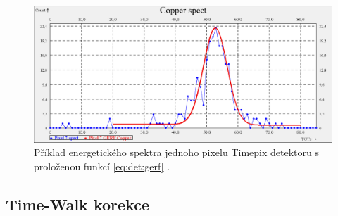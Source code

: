 \begin{figure}[th]
	\begin{center}
		\includegraphics[width=12cm]{figures/calib_gerf.png}
		\caption{Příklad energetického spektra jednoho pixelu Timepix detektoru s proloženou funkcí \ref{eq:det:gerf} \cite{BegeraBcThesis2016}.}
		\label{fig:det:calib:gerf}
	\end{center}
\end{figure}

\subsection{Time-Walk korekce}\label{chap:detectors:calibration:timeWalk}